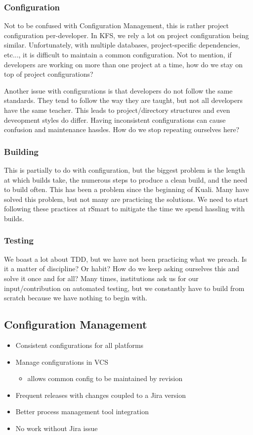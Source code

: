 \documentclass[12pt,notitlepage]{article}
\begin{document}
\subsubsection{Configuration}Not to be confused with Configuration
Management, this is rather project configuration
per-developer. In KFS, we rely a lot on project configuration being
similar. Unfortunately, with multiple databases, project-specific
dependencies, etc..., it is difficult to maintain a common
configuration. Not to mention, if developers are working on more than
one project at a time, how do we stay on top of project
configurations?

Another issue with configurations is that developers do not follow the
same standards. They tend to follow the way they are taught, but not
all developers have the same teacher. This leads to project/directory
structures and even deveopment styles do differ. Having inconsistent
configurations can cause confusion and maintenance hassles. How do we
stop repeating ourselves here?

\subsubsection{Building}
This is partially to do with configuration, but the biggest problem is
the length at which builds take, the numerous steps to produce a clean
build, and the need to build often. This has been a problem since the
beginning of Kuali. Many have solved this problem, but not many are
practicing the solutions. We need to start following these practices
at rSmart to mitigate the time we spend hassling with builds.

\subsubsection{Testing}
We boast a lot about TDD, but we have not been practicing what we
preach. Is it a matter of discipline? Or habit? How do we keep asking
ourselves this and solve it once and for all? Many times, institutions
ask us for our input/contribution on automated testing, but we
constantly have to build from scratch because we have nothing to
begin with.

\subsection{Configuration Management}
\begin{itemize}
  \item Consistent configurations for all platforms
  \item Manage configurations in VCS
    \begin{itemize}
      \item allows common config to be maintained by revision
      \end{itemize}
    \item Frequent releases with changes coupled to a Jira version
    \item Better process management tool integration
    \item No work without Jira issue
\end{itemize}
\end{document}
